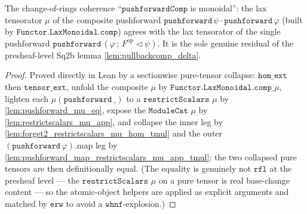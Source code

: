 \begin{lemma}
  \label{lem:pushforwardcomp_lax_mu}
  The change-of-rings coherence ``\(\mathtt{pushforwardComp}\) is monoidal'': the lax
  tensorator \(\mu\) of the composite pushforward
  \(\mathtt{pushforward}\,\psi \cdot \mathtt{pushforward}\,\varphi\) (built by
  \(\mathtt{Functor.LaxMonoidal.comp}\)) agrees with the lax tensorator of the single
  pushforward \(\mathtt{pushforward}\,(\varphi \,;\, F^{\mathrm{op}} \!\lhd\! \psi)\). It is
  the sole genuine residual of the presheaf-level Sq2b lemma \cref{lem:pullbackcomp_delta}.
\end{lemma}
\begin{proof}
  \leanok
  Proved directly in Lean by a sectionwise pure-tensor collapse: \(\mathtt{hom\_ext}\) then
  \(\mathtt{tensor\_ext}\), unfold the composite \(\mu\) by \(\mathtt{Functor.LaxMonoidal.comp\_}\mu\),
  lighten each \(\mu(\mathtt{pushforward}\,\_)\) to a \(\mathtt{restrictScalars}\) \(\mu\) by
  \cref{lem:pushforward_mu_eq}, expose the \(\mathtt{ModuleCat}\) \(\mu\) by
  \cref{lem:restrictscalars_mu_app}, and collapse the inner leg by
  \cref{lem:forget2_restrictscalars_mu_hom_tmul} and the outer
  \((\mathtt{pushforward}\,\varphi).\mathrm{map}\) leg by
  \cref{lem:pushforward_map_restrictscalars_mu_app_tmul}; the two collapsed pure tensors are
  then definitionally equal. (The equality is genuinely not \(\mathtt{rfl}\) at the presheaf
  level --- the \(\mathtt{restrictScalars}\) \(\mu\) on a pure tensor is real base-change
  content --- so the atomic-object helpers are applied as explicit arguments and matched by
  \(\mathtt{erw}\) to avoid a \(\mathtt{whnf}\)-explosion.)
\end{proof}


